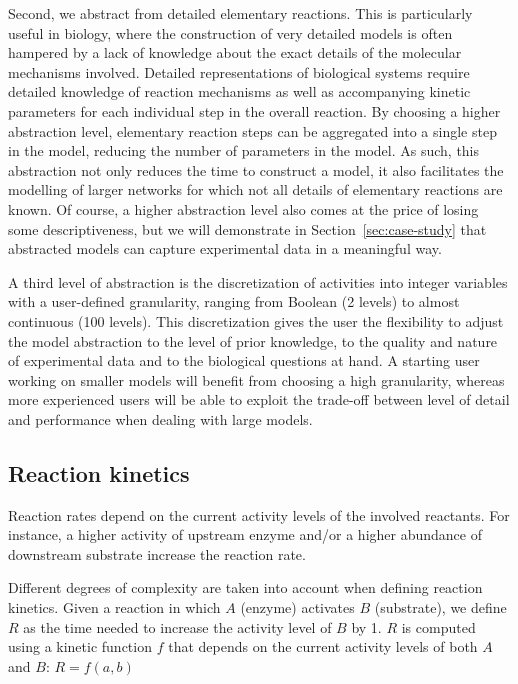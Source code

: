 \documentclass[journal, 10pt]{IEEEtran}
\begin{document}
Second, we abstract from detailed elementary reactions. This is particularly useful in 
biology, where the construction of very detailed models is often hampered by 
a lack of knowledge about the exact details of the molecular mechanisms involved. 
Detailed representations of biological systems require detailed knowledge of reaction mechanisms as well as 
accompanying kinetic parameters for each individual step in the overall reaction. 
By choosing a higher abstraction level, elementary reaction steps can be aggregated into a single step in the model, reducing
the number of parameters in the model. As such, this abstraction not only reduces the time to construct a model, it also facilitates the modelling of larger networks
for which not all details of elementary reactions are known. 
Of course, a higher abstraction level also comes at the price of losing some descriptiveness, but we will demonstrate
in Section~\ref{sec:case-study} that abstracted models can capture experimental data in a meaningful way.

A third level of abstraction is the discretization of activities into integer variables with a user-defined granularity, ranging from Boolean (2 levels) 
to almost continuous (100 levels). This discretization gives the user the flexibility to adjust the model abstraction to the level of 
prior knowledge, to the quality and nature of experimental data and to the biological questions at hand.
A starting user working on smaller models will benefit from choosing a high granularity, whereas
more experienced users will be able to exploit the trade-off between level of detail and performance when dealing with large models.



\subsection{Reaction kinetics}\label{sec:modeling-framework}
Reaction rates depend on the current activity levels of the involved reactants. For instance, a higher activity of upstream enzyme and/or a higher abundance of 
downstream substrate increase the reaction rate. 

Different degrees of complexity are taken into account when defining reaction kinetics. Given a reaction in which $A$ (enzyme) activates $B$ (substrate), we define $R$ as the time needed to increase the activity level of $B$ by 1. $R$ is computed using a kinetic function $f$ that
depends on the current activity levels of both $A$ and $B$: $R = f(a, b)$
\end{document}
